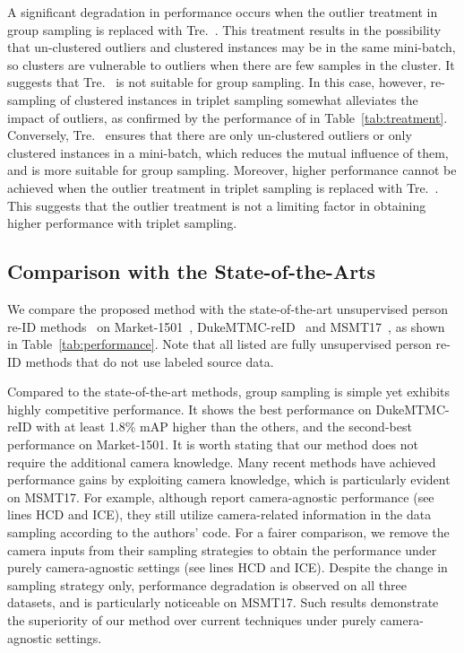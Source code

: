\documentclass[lettersize,journal]{IEEEtran}
\begin{document}
A significant degradation in performance occurs when the outlier treatment in group sampling is replaced with Tre.~\uppercase\expandafter{}.
This treatment results in the possibility that un-clustered outliers and clustered instances may be in the same mini-batch, so clusters are vulnerable to outliers when there are few samples in the cluster. It suggests that Tre.~\uppercase\expandafter{} is not suitable for group sampling. In this case, however, re-sampling of clustered instances in triplet sampling somewhat alleviates the impact of outliers, as confirmed by the performance of  in Table~\ref{tab:treatment}.
Conversely, Tre.~\uppercase\expandafter{} ensures that there are only un-clustered outliers or only clustered instances in a mini-batch, which reduces the mutual influence of them, and is more suitable for group sampling.
Moreover, higher performance cannot be achieved when the outlier treatment in triplet sampling is replaced with Tre.~\uppercase\expandafter{}.
This suggests that the outlier treatment is not a limiting factor in obtaining higher performance with triplet sampling.


\subsection{Comparison with the State-of-the-Arts} \label{sec:sota}

We compare the proposed method with the state-of-the-art unsupervised person re-ID methods~\cite{LOMO,Market,OIM,BUC,DBC,SSL,MMCL,HCT,SpCL,tip-u1,CAP,GCL,ICE,MPRD,IICS,DSCE,CycAs,JVCT,HCD} on Market-1501~\cite{Market}, DukeMTMC-reID~\cite{Duke} and MSMT17~\cite{MSMT}, as shown in Table~\ref{tab:performance}.
Note that all listed are fully unsupervised person re-ID methods that do not use labeled source data.

Compared to the state-of-the-art methods, group sampling is simple yet exhibits highly competitive performance. It shows the best performance on DukeMTMC-reID with at least 1.8\% mAP higher than the others, and the second-best performance on Market-1501. It is worth stating that our method does not require the additional camera knowledge. Many recent methods have achieved performance gains by exploiting camera knowledge, which is particularly evident on MSMT17.
For example, although \cite{HCD,ICE} report camera-agnostic performance (see lines HCD and ICE), they still utilize camera-related information in the data sampling according to the authors' code.
For a fairer comparison, we remove the camera inputs from their sampling strategies to obtain the performance under purely camera-agnostic settings (see lines HCD and ICE).
Despite the change in sampling strategy only, performance degradation is observed on all three datasets, and is particularly noticeable on MSMT17.
Such results demonstrate the superiority of our method over current techniques under purely camera-agnostic settings.
\end{document}
